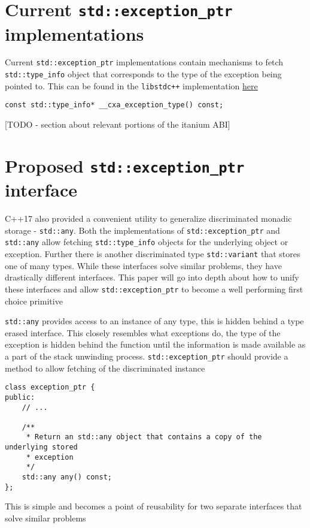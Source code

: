\documentclass{article}
\begin{document}
\section{Current \texttt{std::exception\_ptr} implementations}
Current \texttt{std::exception\_ptr} implementations contain mechanisms to
fetch \texttt{std::type\_info} object that corresponds to the type of the
exception being pointed to.  This can be found in the \texttt{libstdc++}
implementation \href{https://goo.gl/u4oYcv}{here}
\begin{lstlisting}
const std::type_info* __cxa_exception_type() const;
\end{lstlisting}

[TODO - section about relevant portions of the itanium ABI]

\section{Proposed \texttt{std::exception\_ptr} interface}
C++17 also provided a convenient utility to generalize discriminated monadic
storage - \texttt{std::any}.  Both the implementations of
\texttt{std::exception\_ptr} and \texttt{std::any} allow fetching
\texttt{std::type\_info} objects for the underlying object or exception.
Further there is another discriminated type \texttt{std::variant} that stores
one of many types.  While these interfaces solve similar problems, they have
drastically different interfaces.  This paper will go into depth about how to
unify these interfaces and allow \texttt{std::exception\_ptr} to become a well
performing first choice primitive

\texttt{std::any} provides access to an instance of any type, this is hidden
behind a type erased interface.  This closely resembles what exceptions do,
the type of the exception is hidden behind the function until the information
is made available as a part of the stack unwinding process.
\texttt{std::exception\_ptr} should provide a method to allow fetching of the
discriminated instance
\begin{lstlisting}
class exception_ptr {
public:
    // ...

    /**
     * Return an std::any object that contains a copy of the underlying stored
     * exception
     */
    std::any any() const;
};
\end{lstlisting}

This is simple and becomes a point of reusability for two separate interfaces
that solve similar problems
\end{document}
